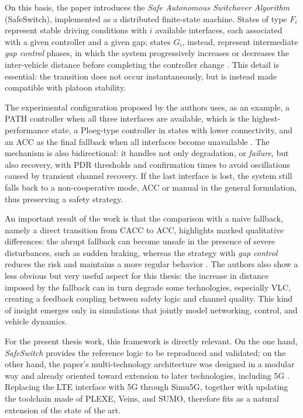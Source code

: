 On this basis, the paper introduces the \emph{Safe Autonomous Switchover Algorithm} (SafeSwitch), implemented as a distributed finite-state machine. States of type $F_i$ represent stable driving conditions with $i$ available interfaces, each associated with a given controller and a given gap; states $G_i$, instead, represent intermediate \emph{gap control} phases, in which the system progressively increases or decreases the inter-vehicle distance before completing the controller change \cite{segata2023multi-technology}. This detail is essential: the transition does not occur instantaneously, but is instead made compatible with platoon stability.

The experimental configuration proposed by the authors uses, as an example, a PATH controller when all three interfaces are available, which is the highest-performance state, a Ploeg-type controller in states with lower connectivity, and an ACC as the final fallback when all interfaces become unavailable \cite{segata2023multi-technology}. The mechanism is also bidirectional: it handles not only degradation, or \emph{failure}, but also recovery, with PDR thresholds and confirmation times to avoid oscillations caused by transient channel recovery. If the last interface is lost, the system still falls back to a non-cooperative mode, ACC or manual in the general formulation, thus preserving a safety strategy.

An important result of the work is that the comparison with a naive fallback, namely a direct transition from CACC to ACC, highlights marked qualitative differences: the abrupt fallback can become unsafe in the presence of severe disturbances, such as sudden braking, whereas the strategy with \emph{gap control} reduces the risk and maintains a more regular behavior \cite{segata2023multi-technology}. The authors also show a less obvious but very useful aspect for this thesis: the increase in distance imposed by the fallback can in turn degrade some technologies, especially VLC, creating a feedback coupling between safety logic and channel quality. This kind of insight emerges only in simulations that jointly model networking, control, and vehicle dynamics.

For the present thesis work, this framework is directly relevant. On the one hand, \emph{SafeSwitch} provides the reference logic to be reproduced and validated; on the other hand, the paper's multi-technology architecture was designed in a modular way and already oriented toward extension to later technologies, including 5G \cite{segata2023multi-technology}. Replacing the LTE interface with 5G through Simu5G, together with updating the toolchain made of PLEXE, Veins, and SUMO, therefore fits as a natural extension of the state of the art.
